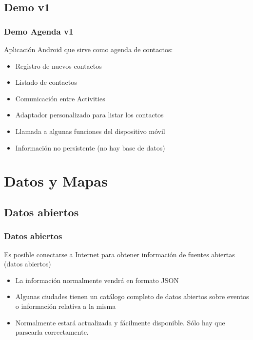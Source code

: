 \documentclass[xcolor={dvipsnames}]{beamer}
\begin{document}
\subsection{Demo v1}
\begin{frame}\frametitle{Demo Agenda v1}
    
    Aplicación Android que sirve como agenda de contactos:

    \begin{itemize}
        \item Registro de nuevos contactos
        \item Listado de contactos
        \item Comunicación entre Activities
        \item Adaptador personalizado para listar los contactos
        \item Llamada a algunas funciones del dispositivo móvil
        \item Información no persistente (no hay base de datos)
    \end{itemize}
\end{frame}

\section{Datos y Mapas}
\subsection{Datos abiertos}
\begin{frame}\frametitle{Datos abiertos}
    \begin{block}{}
    Es posible conectarse a Internet para obtener información de fuentes abiertas (datos abiertos)
    \end{block}
    \begin{itemize}
        \item La información normalmente vendrá en formato JSON
        \item Algunas ciudades tienen un catálogo completo de datos abiertos sobre eventos o información relativa a la misma
        \item Normalmente estará actualizada y fácilmente disponible. Sólo hay que parsearla correctamente.
    \end{itemize}
\end{frame}
\end{document}
